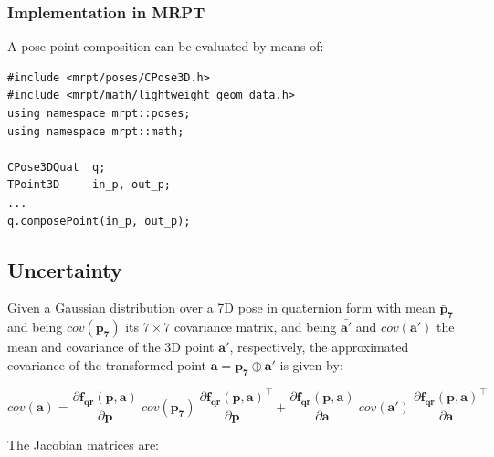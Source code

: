 \documentclass[a4paper,11pt]{report}
\begin{document}
\subsubsection{Implementation in MRPT}

A pose-point composition can be evaluated by means of:

\begin{lstlisting}
#include <mrpt/poses/CPose3D.h>
#include <mrpt/math/lightweight_geom_data.h>
using namespace mrpt::poses;
using namespace mrpt::math;

CPose3DQuat  q;
TPoint3D     in_p, out_p;
...
q.composePoint(in_p, out_p);
\end{lstlisting}


\subsection{Uncertainty}

Given a Gaussian distribution over a 7D pose in quaternion form with
mean ${\mathbf{\bar{p}_7}}$ and being $cov(\mathbf{p_7})$ its $7 \times 7$ covariance matrix,
and being ${\mathbf{\bar{a'}}}$ and $cov(\mathbf{a'})$ the mean and covariance of the 3D point
$\mathbf{a'}$, respectively, the approximated covariance of the transformed point
$\mathbf{a} = \mathbf{p_7} \oplus \mathbf{a'}$ is given by:

\begin{equation}
cov(\mathbf{a}) =
\frac{\partial \mathbf{f_{qr}} (\mathbf{p},\mathbf{a})}{\partial \mathbf{p}} ~
cov(\mathbf{p_7})  ~
\frac{\partial \mathbf{f_{qr}} (\mathbf{p},\mathbf{a})}{\partial \mathbf{p}}^\top
+
\frac{\partial \mathbf{f_{qr}} (\mathbf{p},\mathbf{a})}{\partial \mathbf{a}} ~
cov(\mathbf{a'})  ~
\frac{\partial \mathbf{f_{qr}} (\mathbf{p},\mathbf{a})}{\partial \mathbf{a}}^\top
\end{equation}


The Jacobian matrices are:
\end{document}
